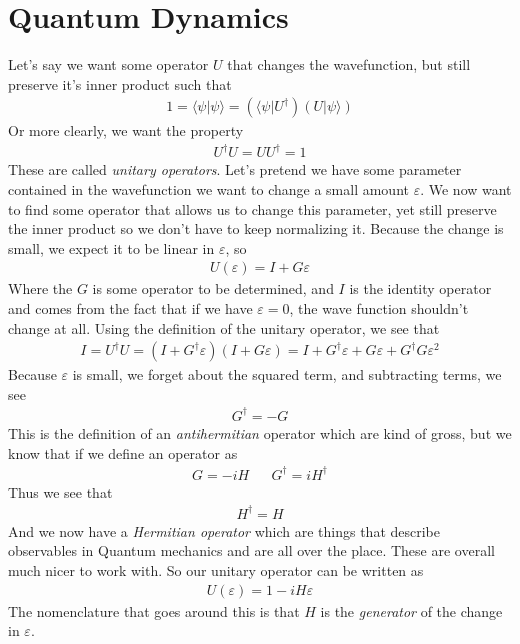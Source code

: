 \section{Quantum Dynamics}
Let's say we want some operator $U$ that  changes the wavefunction, but still preserve it's inner product such that
\begin{align}
1 = \langle \psi |\psi\rangle = (\langle\psi|U^\dagger )(U|\psi\rangle)
\end{align}
Or more clearly, we want the property
\begin{align}
U^\dagger U = UU^\dagger = 1
\end{align}
These are called \emph{unitary operators}. Let's pretend we have some parameter contained in the wavefunction we want to change a small amount $\varepsilon$. We now want to find some operator that allows us to change this parameter, yet still preserve the inner product so we don't have to keep normalizing it. Because the change is small, we expect it to be linear in $\varepsilon$, so 
\begin{align}
U(\varepsilon) = I + G\varepsilon
\end{align}
Where the $G$ is some operator to be determined, and $I$ is the identity operator and comes from the fact that if we have $\varepsilon = 0$, the wave function shouldn't change at all. Using the definition of the unitary operator, we see that
\begin{align}
I = U^\dagger U  = (I +G^\dagger\varepsilon)(I + G\varepsilon) = I + G^\dagger\varepsilon + G\varepsilon + G^\dagger G\varepsilon^2
\end{align}
Because $\varepsilon$ is small, we forget about the squared term, and subtracting terms, we see
\begin{align}
G^\dagger = -G
\end{align}
This is the definition of an \emph{antihermitian} operator which are kind of gross, but we know that if we define an operator as
\begin{align}
G = -iH && G^\dagger = iH^\dagger
\end{align}
Thus we see that
\begin{align}
H^\dagger = H
\end{align}
And we now have a \emph{Hermitian operator} which are things that describe observables in Quantum mechanics and are all over the place. These are overall much nicer to work with. So our unitary operator can be written as 
\begin{align}
U(\varepsilon) = 1 -iH\varepsilon
\end{align}
The nomenclature that goes around this is that $H$ is the \emph{generator} of the change in $\varepsilon$. 







